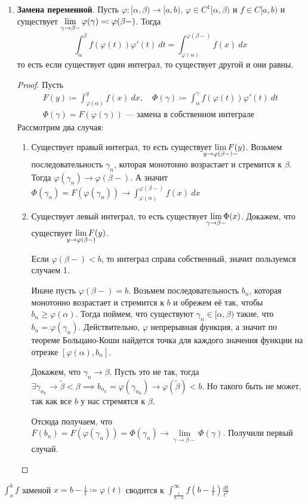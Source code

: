 \begin{enumerate}
    \item \textbf{Замена переменной}. Пусть $\varphi\colon [\alpha, \beta) \to [a, b),\, \varphi \in C^{1}[\alpha, \beta)$ и $f \in C[a, b)$ и существует $\lim\limits_{\gamma \to \beta-}
  \varphi(\gamma) \leftcoleqq \varphi(\beta-)$. Тогда
    \begin{equation*}
      \int_{\alpha}^{\beta} f(\varphi(t))\varphi'(t) \: dt =
      \int_{\varphi(\alpha)}^{\varphi(\beta-)} f(x) \: dx
    \end{equation*}
  то есть если существует один интеграл, то существует другой и они равны.
  \begin{proof}
    Пусть
    \begin{equation*}
      \begin{gathered}
        F(y) \coloneqq \int_{\varphi(\alpha)}^{y} f(x) \: dx, \quad \Phi(\gamma) \coloneqq
        \int_{\alpha}^{\gamma} f(\varphi(t))\varphi'(t) \: dt \\
        \Phi(\gamma) = F(\varphi(\gamma))\text{ --- замена в собственном интеграле}
      \end{gathered}
    \end{equation*}
    Рассмотрим два случая:
    \begin{enumerate}[1)]
      \item Существует правый интеграл, то есть существует $\lim\limits_{\mathclap{y \to \varphi(\beta-)-}} F(y)$. Возьмем последовательность $\gamma_n$, которая монотонно возрастает и стремится к $\beta$. Тогда $\varphi(\gamma_n) \to \varphi(\beta-)$.
  А значит $\Phi(\gamma_n) = F(\varphi(\gamma_n)) \to \int_{\varphi(\alpha)}^{\varphi(\beta -)} f(x) \: dx$
      \item Существует левый интеграл, то есть существует $\lim\limits_{\mathclap{\gamma \to \beta-}}\Phi(x)$. Докажем, что существует $\lim\limits_{\mathclap{y \to \varphi(\beta -)}}F(y)$.

      Если $\varphi(\beta -) < b$, то интеграл справа собственный, значит пользуемся случаем 1.

      Иначе пусть $\varphi(\beta -) = b$. Возьмем последовательность $b_n$, которая монотонно возрастает и стремится к $b$ и обрежем её так, чтобы $b_n \geq \varphi(\alpha)$. Тогда поймем, что существуют $\gamma_n \in [\alpha, \beta)$ такие, что $b_n = \varphi(\gamma_n)$. Действительно, $\varphi$ непрерывная функция, а значит по теореме Больцано-Коши найдется точка для каждого значения функции на отрезке $[\varphi(\alpha), b_n]$.

      Докажем, что $\gamma_n \to \beta$. Пусть это не так, тогда $\exists \gamma_{n_k} \to \widetilde{\beta} < \beta \implies b_{n_k} = \varphi(\gamma_{n_k}) \to \varphi(\widetilde{\beta}) < b$. Но такого быть не может, так как все $b$ у нас стремятся к $\beta$.

      Отсюда получаем, что $F(b_n) = F(\varphi(\gamma_n)) = \Phi(\gamma_n) \to \lim\limits_{\gamma \to \beta-} \Phi(\gamma)$. Получили первый случай.
    \end{enumerate}
  \end{proof}
\end{enumerate}

\begin{notice}
  $\displaystyle \int_{a}^{b} f$ заменой $x = b - \frac{1}{t} \coloneqq \varphi(t)$ сводится к
  $\displaystyle \int_{\frac{1}{b - a}}^{\infty} f(b - \frac{1}{t})\frac{dt}{t^2}$
\end{notice}

